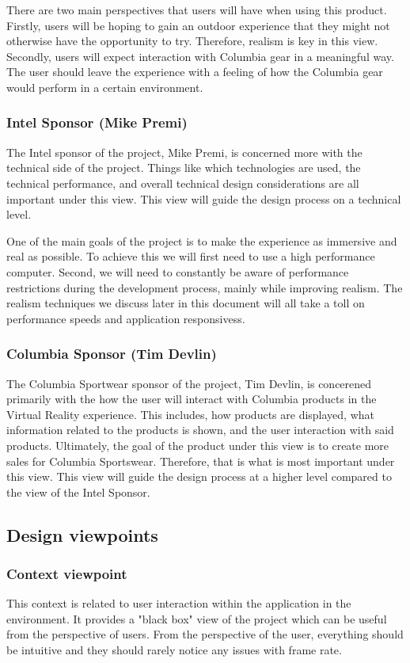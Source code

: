 \documentclass[10pt,journal,compsoc,onecolumn, draftclsnofoot]{IEEEtran}
\begin{document}
There are two main perspectives that users will have when using this product.
Firstly, users will be hoping to gain an outdoor experience that they might not otherwise have the opportunity to try. Therefore, realism is key in this view.
Secondly, users will expect interaction with Columbia gear in a meaningful way.
The user should leave the experience with a feeling of how the Columbia gear would perform in a certain environment.


\subsubsection{Intel Sponsor (Mike Premi)}
The Intel sponsor of the project, Mike Premi, is concerned more with the technical side of the project.
Things like which technologies are used, the technical performance, and overall technical design considerations are all important under this view.
This view will guide the design process on a technical level.

One of the main goals of the project is to make the experience as immersive and real as possible. To achieve this we will first need to use a high performance computer. Second, we will need to constantly be aware of performance restrictions during the development process, mainly while improving realism. The realism techniques we discuss later in this document will all take a toll on performance speeds and application responsivess.

\subsubsection{Columbia Sponsor (Tim Devlin)}
The Columbia Sportwear sponsor of the project, Tim Devlin, is concerened primarily with the how the user will interact with Columbia products in the Virtual Reality experience.
This includes, how products are displayed, what information related to the products is shown, and the user interaction with said products.
Ultimately, the goal of the product under this view is to create more sales for Columbia Sportswear.
Therefore, that is what is most important under this view.
This view will guide the design process at a higher level compared to the view of the Intel Sponsor.

\subsection{Design viewpoints}
\subsubsection{Context viewpoint}
This context is related to user interaction within the application in the
environment. It provides a "black box" view of the project which can be useful
from the perspective of users. From the perspective of the user,
everything should be intuitive and they should rarely notice any issues with
frame rate.\\
\end{document}

